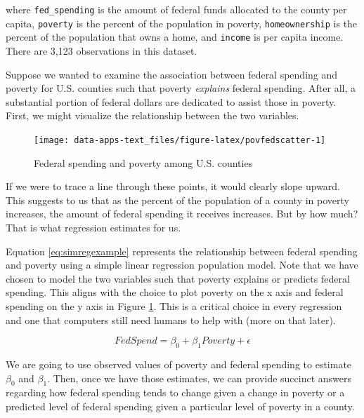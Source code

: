 \documentclass[
]{book}
\begin{document}
where \texttt{fed\_spending} is the amount of federal funds allocated to the county per capita, \texttt{poverty} is the percent of the population in poverty, \texttt{homeownership} is the percent of the population that owns a home, and \texttt{income} is per capita income. There are 3,123 observations in this dataset.

Suppose we wanted to examine the association between federal spending and poverty for U.S. counties such that poverty \emph{explains} federal spending. After all, a substantial portion of federal dollars are dedicated to assist those in poverty. First, we might visualize the relationship between the two variables.

\begin{figure}

{\centering \texttt{[image: data-apps-text\_files/figure-latex/povfedscatter-1]} 

}

\caption{Federal spending and poverty among U.S. counties}\label{fig:povfedscatter}
\end{figure}

If we were to trace a line through these points, it would clearly slope upward. This suggests to us that as the percent of the population of a county in poverty increases, the amount of federal spending it receives increases. But by how much? That is what regression estimates for us.

Equation \eqref{eq:simregexample} represents the relationship between federal spending and poverty using a simple linear regression population model. Note that we have chosen to model the two variables such that poverty explains or predicts federal spending. This aligns with the choice to plot poverty on the x axis and federal spending on the y axis in Figure \ref{fig:povfedscatter}. This is a critical choice in every regression and one that computers still need humans to help with (more on that later).

\begin{equation}
FedSpend = \beta_0+\beta_1Poverty + \epsilon
\label{eq:simregexample}
\end{equation}

We are going to use observed values of poverty and federal spending to estimate \(\beta_0\) and \(\beta_1\). Then, once we have those estimates, we can provide succinct answers regarding how federal spending tends to change given a change in poverty or a predicted level of federal spending given a particular level of poverty in a county.
\end{document}
